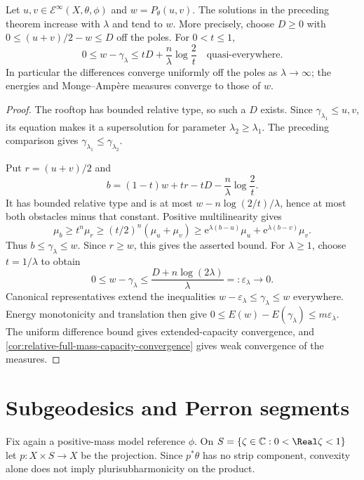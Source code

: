 \begin{theorem}\label{thm:rooftop-exponential-approximation}
Let $u,v\in\mathcal E^\infty(X,\theta,\phi)$ and $w=P_\theta(u,v)$. The solutions in the preceding theorem increase with $\lambda$ and tend to $w$. More precisely, choose $D\geq0$ with
$0\leq(u+v)/2-w\leq D$ off the poles. For $0<t\leq1$,
\[
 0\leq w-\gamma_\lambda
           \leq tD+\frac n\lambda\log\frac2t
                 \quad\text{quasi-everywhere}.
\]
In particular the differences converge uniformly off the poles as $\lambda\to\infty$; the energies and Monge--Amp\`ere measures converge to those of $w$.
\end{theorem}
\begin{proof}
The rooftop has bounded relative type, so such a $D$ exists. Since $\gamma_{\lambda_1}\leq u,v$, its equation makes it a supersolution for parameter $\lambda_2\geq\lambda_1$. The preceding comparison gives $\gamma_{\lambda_1}\leq\gamma_{\lambda_2}$.

Put $r=(u+v)/2$ and
\[
 b=(1-t)w+tr-tD-\frac n\lambda\log\frac2t.
\]
It has bounded relative type and is at most $w-n\log(2/t)/\lambda$, hence at most both obstacles minus that constant. Positive multilinearity gives
\[
 \mu_b\geq t^n\mu_r
       \geq(t/2)^n(\mu_u+\mu_v)
       \geq\mathrm e^{\lambda(b-u)}\mu_u
                         +\mathrm e^{\lambda(b-v)}\mu_v.
\]
Thus $b\leq\gamma_\lambda\leq w$. Since $r\geq w$, this gives the asserted bound. For $\lambda\geq1$, choose $t=1/\lambda$ to obtain
\[
 0\leq w-\gamma_\lambda
                \leq\frac{D+n\log(2\lambda)}{\lambda}
                       =:\varepsilon_\lambda\longrightarrow0.
\]
Canonical representatives extend the inequalities
$w-\varepsilon_\lambda\leq\gamma_\lambda\leq w$ everywhere. Energy monotonicity and translation then give
$0\leq E(w)-E(\gamma_\lambda)\leq m\varepsilon_\lambda$.
The uniform difference bound gives extended-capacity convergence, and \cref{cor:relative-full-mass-capacity-convergence} gives weak convergence of the measures.
\end{proof}





\section{Subgeodesics and Perron segments}
\label{sec:relative-weak-geodesics}
Fix again a positive-mass model reference $\phi$. On $S=\{\zeta\in\mathbb C:0<\Real\zeta<1\}$ let $p:X\times S\to X$ be the projection. Since $p^*\theta$ has no strip component, convexity alone does not imply plurisubharmonicity on the product.

